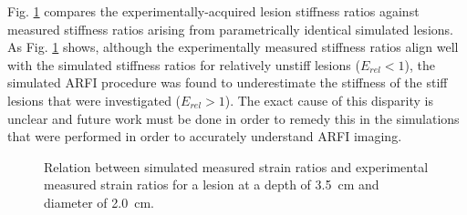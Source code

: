 			Fig. \ref{fig:arfi_phantom_validation} compares the experimentally-acquired lesion stiffness ratios against measured stiffness ratios arising from parametrically identical simulated lesions. As Fig. \ref{fig:arfi_phantom_validation} shows, although the experimentally measured stiffness ratios align well with the simulated stiffness ratios for relatively unstiff lesions ($E_{rel} < 1$), the simulated ARFI procedure was found to underestimate the stiffness of the stiff lesions that were investigated ($E_{rel} > 1$). The exact cause of this disparity is unclear and future work must be done in order to remedy this in the simulations that were performed in order to accurately understand ARFI imaging.

			\begin{figure}[!htb]
				\centering
				\caption[Experimental validation of ARFI imaging model results]{Relation between simulated measured strain ratios and experimental measured strain ratios for a lesion at a depth of \SI{3.5}{\cm} and diameter of \SI{2.0}{\cm}.}
				\label{fig:arfi_phantom_validation}
			\end{figure}

